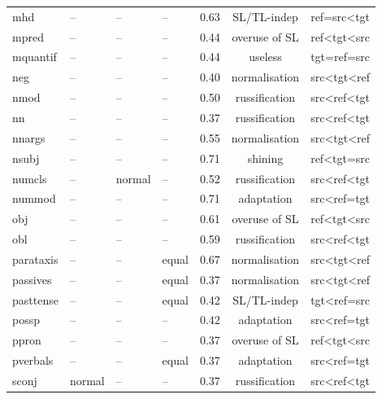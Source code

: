 \begin{longtable}{l|p{2cm}p{2cm}p{1.5cm}ccc}
	mhd           & --     & --     & --    & 0.63 & SL/TL-indep    & ref=src\textless{}tgt           \\
	mpred         & --     & --     & --    & 0.44 & overuse of SL  & ref\textless{}tgt\textless{}src \\
	mquantif      & --     & --     & --    & 0.44 & useless        & tgt=ref=src                     \\
	neg           & --     & --     & --    & 0.40 & normalisation  & src\textless{}tgt\textless{}ref \\
	nmod          & --     & --     & --    & 0.50 & russification  & src\textless{}ref\textless{}tgt \\
	nn            & --     & --     & --    & 0.37 & russification  & src\textless{}ref\textless{}tgt \\
	nnargs        & --     & --     & --    & 0.55 & normalisation  & src\textless{}tgt\textless{}ref \\
	nsubj         & --     & --     & --    & 0.71 & shining        & ref\textless{}tgt=src           \\
	numcls        & --     & normal & --    & 0.52 & russification  & src\textless{}ref\textless{}tgt \\
	nummod        & --     & --     & --    & 0.71 & adaptation     & src\textless{}ref=tgt        \\
	obj           & --     & --     & --    & 0.61 & overuse of SL  & ref\textless{}tgt\textless{}src \\
	obl           & --     & --     & --    & 0.59 & russification  & src\textless{}ref\textless{}tgt \\
	parataxis     & --     & --     & equal & 0.67 & normalisation  & src\textless{}tgt\textless{}ref \\
	passives      & --     & --     & equal & 0.37 & normalisation  & src\textless{}tgt\textless{}ref \\
	pasttense     & --     & --     & equal & 0.42 & SL/TL-indep    & tgt\textless{}ref=src           \\
	possp         & --     & --     & --    & 0.42 & adaptation     & src\textless{}ref=tgt        \\
	ppron         & --     & --     & --    & 0.37 & overuse of SL  & ref\textless{}tgt\textless{}src \\
	pverbals      & --     & --     & equal & 0.37 & adaptation     & src\textless{}ref=tgt        \\  %
	sconj         & normal & --     & --    & 0.37 & russification  & src\textless{}ref\textless{}tgt \\

\end{longtable}
